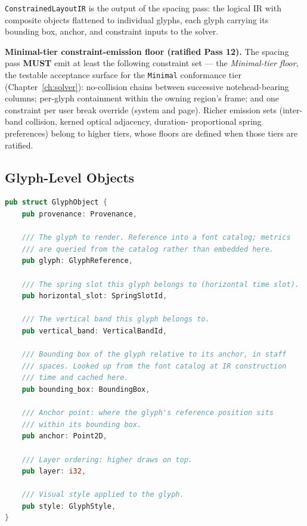\documentclass[11pt,letterpaper]{report}
\newcounter{requirement}[chapter]
\newcommand{\MUST}{\textbf{MUST}}
\begin{document}
\texttt{ConstrainedLayoutIR} is the output of the spacing pass: the
logical IR with composite objects flattened to individual glyphs,
each glyph carrying its bounding box, anchor, and constraint inputs
to the solver.

\begin{requirement}
  \label{req:layoutir:constraint-floor}
  \textbf{Minimal-tier constraint-emission floor (ratified Pass 12).}
  The spacing pass \MUST{} emit at least the following constraint
  set --- the \emph{Minimal-tier floor}, the testable acceptance
  surface for the \texttt{Minimal} conformance tier
  (Chapter~\ref{ch:solver}): no-collision chains between
  successive notehead-bearing columns; per-glyph containment
  within the owning region's frame; and one constraint per user
  break override (system and page). Richer emission sets
  (inter-band collision, kerned optical adjacency, duration-
  proportional spring preferences) belong to higher tiers, whose
  floors are defined when those tiers are ratified.
\end{requirement}

\subsection{Glyph-Level Objects}

\begin{lstlisting}[language=Rust]
pub struct GlyphObject {
    pub provenance: Provenance,

    /// The glyph to render. Reference into a font catalog; metrics
    /// are queried from the catalog rather than embedded here.
    pub glyph: GlyphReference,

    /// The spring slot this glyph belongs to (horizontal time slot).
    pub horizontal_slot: SpringSlotId,

    /// The vertical band this glyph belongs to.
    pub vertical_band: VerticalBandId,

    /// Bounding box of the glyph relative to its anchor, in staff
    /// spaces. Looked up from the font catalog at IR construction
    /// time and cached here.
    pub bounding_box: BoundingBox,

    /// Anchor point: where the glyph's reference position sits
    /// within its bounding box.
    pub anchor: Point2D,

    /// Layer ordering: higher draws on top.
    pub layer: i32,

    /// Visual style applied to the glyph.
    pub style: GlyphStyle,
}
\end{lstlisting}
\end{document}

